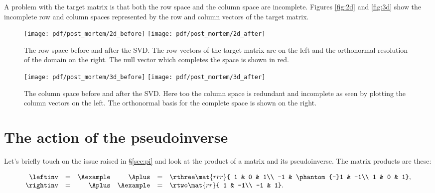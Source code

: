A problem with the target matrix is that both the row space and the column space are incomplete. Figures \eqref{fig:2d} and \eqref{fig:3d} show the incomplete row and column spaces represented by the row and column vectors of the target matrix.
\begin{figure}[htbp] %
   \centering
   \texttt{[image: pdf/post\_mortem/2d\_before]} \qquad
   \texttt{[image: pdf/post\_mortem/2d\_after]} 
   \caption[The row space before and after the SVD]{The row space before and after the SVD. The row vectors of the target matrix are on the left and the orthonormal resolution of the domain on the right. The null vector which completes the space is shown in red.}
   \label{fig:2d}
\end{figure}

\begin{figure}[htbp] %
   \centering
   \texttt{[image: pdf/post\_mortem/3d\_before]} \qquad
   \texttt{[image: pdf/post\_mortem/3d\_after]} 
   \caption[The column space before and after the SVD]{The column space before and after the SVD. Here too the column space is redundant and incomplete as seen by plotting the column vectors on the left. The orthonormal basis for the complete space is shown on the right.}
   \label{fig:3d}
\end{figure}

\section{The action of the pseudoinverse}
Let's briefly touch on the issue raised in \S\eqref{sec:pi} and look at the product of a matrix and its pseudoinverse. The matrix products are these:

\begin{equation}
  \begin{array}{rcrrcl}
    \leftinv  &=& \Aexample & \Aplus &=& \rthree
    \mat{rrr}
    { 1 & 0 &  1\\
     -1 & \phantom{-}1 & -1\\
      1 & 0 &  1},\\
    \rightinv &=& \Aplus & \Aexample &=& \rtwo
    \mat{rr}
    { 1 & -1\\
     -1 & 1}.\\
  \end{array}
\end{equation}

